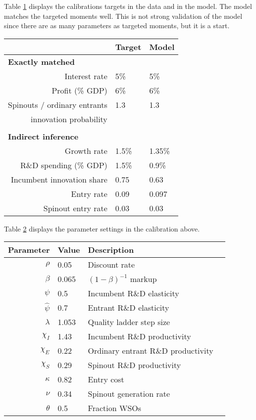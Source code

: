 \documentclass[12pt,english]{article}
\theoremstyle{remark}
\begin{document}
Table \ref{calibration_targets} displays the calibrations targets in the data and in the model. The model matches the targeted moments well. This is not strong validation of the model since there are as many parameters as targeted moments, but it is a start. 


\begin{table}
	\centering
	\label{calibration_targets}
	\begin{tabular}{rll}
		\toprule \toprule
		  & Target & Model \tabularnewline
		\midrule
		\multicolumn{1}{l}{\textbf{Exactly matched}} & &  \tabularnewline
		Interest rate & 5\% & 5\% \tabularnewline
		Profit (\% GDP) & 6\% & 6\% \tabularnewline
		Spinouts / ordinary entrants & 1.3 & 1.3 \tabularnewline
		innovation probability \tabularnewline
		\tabularnewline
		\multicolumn{1}{l}{\textbf{Indirect inference}} & & 
		\tabularnewline
		Growth rate & 1.5\% & 1.35\% 
		\tabularnewline
		R\&D spending (\% GDP) & 1.5\% & 0.9\% 
		\tabularnewline		
		Incumbent innovation share & 0.75 & 0.63
		\tabularnewline
		Entry rate & 0.09 & 0.097
		\tabularnewline
		Spinout entry rate & 0.03 & 0.03
		\tabularnewline
		\bottomrule
	\end{tabular}
\end{table}

Table \ref{calibration_parameters} displays the parameter settings in the calibration above. 

\begin{table}
	\centering
	\label{calibration_parameters}
	\begin{tabular}{rlll}
		\toprule \toprule
		Parameter & Value & Description \tabularnewline
		\midrule
		$\rho$ & 0.05 & Discount rate \tabularnewline
		$\beta$ & 0.065 & $(1-\beta)^{-1}$ markup\tabularnewline
		$\psi$ & 0.5 & Incumbent R\&D elasticity \tabularnewline
		$\hat{\psi}$ & 0.7 & Entrant R\&D elasticity \tabularnewline
		$\lambda$ & 1.053 & Quality ladder step size \tabularnewline
		$\chi_I$ & 1.43 & Incumbent R\&D productivity \tabularnewline
		$\chi_E$ & 0.22 & Ordinary entrant R\&D productivity \tabularnewline
		$\chi_S$ & 0.29 & Spinout R\&D productivity \tabularnewline
		$\kappa$ & 0.82 & Entry cost \tabularnewline
		$\nu$ & 0.34 & Spinout generation rate \tabularnewline
		$\theta$ & 0.5 & Fraction WSOs\tabularnewline
		\bottomrule
	\end{tabular}
\end{table}
\end{document}

